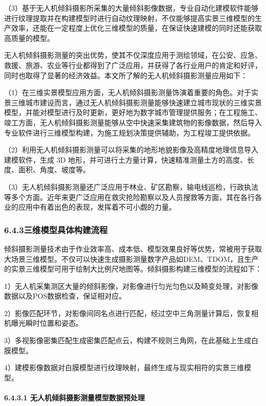 （3）基于无人机倾斜摄影所采集的大量倾斜影像数据，专业自动化建模软件能够进行纹理提取并在构建模型时进行自动纹理映射，不仅能够提高实景三维模型的生产效率，还能在一定程度上优化三维模型的质量，在保证快速建模的同时还能获取高质量的模型。

无人机倾斜摄影测量的突出优势，使其不仅深度应用于测绘领域，在公安、应急、救援、旅游、农业等行业都得到了广泛应用，并获得了各行业用户的肯定和好评，同时也取得了显著的经济效益。本文所了解的无人机倾斜摄影测量应用如下：

（1）在三维实景模型应用方面，无人机倾斜摄影测量饰演着重要的角色。对于实景三维城市建设而言，通过无人机倾斜摄影测量能够快速建立城市现状的三维实景模型，并能对模型进行及时更新，更好地为数字城市管理提供服务；在工程施工、竣工方面，无人机倾斜摄影测量能够从空中快速采集建筑物的影像数据，然后导入专业软件进行三维模型构建，为施工规划决策提供辅助，为工程竣工提供依据。

（2）利用无人机倾斜摄影测量可以将采集的地形地貌影像及高精度地理信息导入建模软件，生成 3D 地形，并可进行土方量计算，快速精准测量土方的高度、长度、面积、角度、坡度等。

（3）无人机倾斜摄影测量还广泛应用于林业、矿区勘察，输电线巡检，行政执法等多个方面。近年来更广泛应用在救灾抢险勘察以及人员搜救等方面，其在各行各业的应用中有着出色的表现，发挥着不可小觑的力量。

\hypertarget{ux4e09ux7ef4ux6a21ux578bux5177ux4f53ux6784ux5efaux6d41ux7a0b}{%
\subsubsection{6.4.3三维模型具体构建流程}\label{ux4e09ux7ef4ux6a21ux578bux5177ux4f53ux6784ux5efaux6d41ux7a0b}}

倾斜摄影测量技术由于作业效率高、成本低、模型效果良好等优势，常被用于获取大场景三维模型。不仅可以快速生成摄影测量数字产品如DEM、TDOM，且生产的实景三维模型可用于绘制大比例尺地图等。倾斜摄影构建三维模型的流程如下：

1）无人机采集测区大量的倾斜影像，对影像进行匀光匀色以及畸变处理，对影像数据以及POS数据检查，保证相对应。

2）影像匹配环节，对影像间同名点进行匹配，经过空中三角测量计算后，恢复相机曝光瞬时位置和姿态。

3）多视影像密集匹配生成密集匹配点云，构建不规则三角网，在此基础上生成白膜模型。

4）建模影像数据对白膜模型进行纹理映射，最终生成与现实相符的实景三维模型。

\hypertarget{ux65e0ux4ebaux673aux503eux659cux6444ux5f71ux6d4bux91cfux6a21ux578bux6570ux636eux9884ux5904ux7406}{%
\paragraph{6.4.3.1 无人机倾斜摄影测量模型数据预处理}\label{ux65e0ux4ebaux673aux503eux659cux6444ux5f71ux6d4bux91cfux6a21ux578bux6570ux636eux9884ux5904ux7406}}

